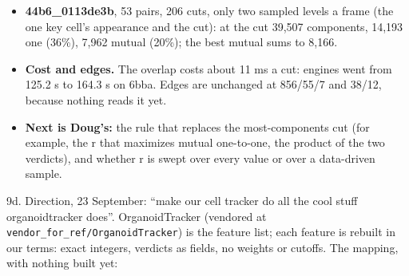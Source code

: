 \begin{itemize}
\begin{itemize}
\item at the earlier frame's cut: 61,679 components, 15,979 overlap exactly one (26\%), and \textbf{6,688 mutual (11\%)};
\item the best mutual over each pair's sampled cuts sums to \textbf{13,783} (139 a pair, against 68 at the cut);
\item frame 0→1 at level 1,045,988: 204 components, 167 one, \textbf{144 mutual}. At the cut, level 84,314: 329 components, 83 one, 29 mutual;
\item the mutual count peaks high in the tree (codes about 1.0 to 1.1M of about 1.1M), at 150 to 200 components a frame, where 70–80\% of the components are mutual. The most-components cut sits low, where 10–30\% are.
\end{itemize}
\item \textbf{44b6\_\allowbreak{}0113de3b}, 53 pairs, 206 cuts, only two sampled levels a frame (the one key cell's appearance and the cut): at the cut 39,507 components, 14,193 one (36\%), 7,962 mutual (20\%); the best mutual sums to 8,166.
\item \textbf{Cost and edges.} The overlap costs about 11 ms a cut: engines went from 125.2 s to 164.3 s on 6bba. Edges are unchanged at 856/55/7 and 38/12, because nothing reads it yet.
\item \textbf{Next is Doug's:} the rule that replaces the most-components cut (for example, the r that maximizes mutual one-to-one, the product of the two verdicts), and whether r is swept over every value or over a data-driven sample.
\end{itemize}

9d. Direction, 23 September: “make our cell tracker do all the cool stuff organoidtracker does”. OrganoidTracker (vendored at \texttt{vendor\_\allowbreak{}for\_\allowbreak{}ref/\allowbreak{}Organoid\allowbreak{}Tracker}) is the feature list; each feature is rebuilt in our terms: exact integers, verdicts as fields, no weights or cutoffs. The mapping, with nothing built yet:

